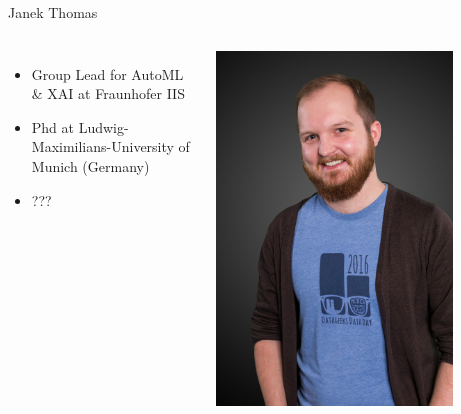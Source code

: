 \begin{frame}[c]{Janek Thomas}

\begin{columns}
	
	
	\begin{itemize}
		\item Group Lead for AutoML \& XAI at Fraunhofer IIS
		\item Phd at Ludwig-Maximilians-University of Munich (Germany)
		\item ???
	\end{itemize}
	
	
	\includegraphics[width=0.8\textwidth]{images/janek.jpg}
	
\end{columns}

\end{frame}
